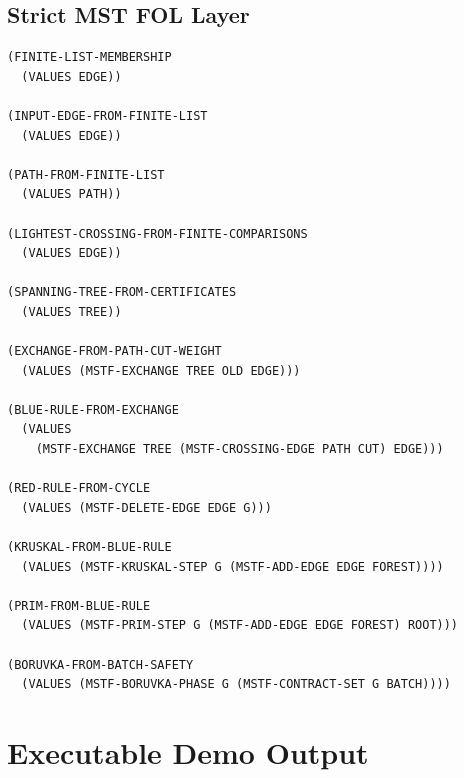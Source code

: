 \documentclass[runningheads]{llncs}
\begin{document}
\subsection{Strict MST FOL Layer}

\begin{lstlisting}
(FINITE-LIST-MEMBERSHIP
  (VALUES EDGE))

(INPUT-EDGE-FROM-FINITE-LIST
  (VALUES EDGE))

(PATH-FROM-FINITE-LIST
  (VALUES PATH))

(LIGHTEST-CROSSING-FROM-FINITE-COMPARISONS
  (VALUES EDGE))

(SPANNING-TREE-FROM-CERTIFICATES
  (VALUES TREE))

(EXCHANGE-FROM-PATH-CUT-WEIGHT
  (VALUES (MSTF-EXCHANGE TREE OLD EDGE)))

(BLUE-RULE-FROM-EXCHANGE
  (VALUES
    (MSTF-EXCHANGE TREE (MSTF-CROSSING-EDGE PATH CUT) EDGE)))

(RED-RULE-FROM-CYCLE
  (VALUES (MSTF-DELETE-EDGE EDGE G)))

(KRUSKAL-FROM-BLUE-RULE
  (VALUES (MSTF-KRUSKAL-STEP G (MSTF-ADD-EDGE EDGE FOREST))))

(PRIM-FROM-BLUE-RULE
  (VALUES (MSTF-PRIM-STEP G (MSTF-ADD-EDGE EDGE FOREST) ROOT)))

(BORUVKA-FROM-BATCH-SAFETY
  (VALUES (MSTF-BORUVKA-PHASE G (MSTF-CONTRACT-SET G BATCH))))
\end{lstlisting}

\section{Executable Demo Output}
\end{document}
